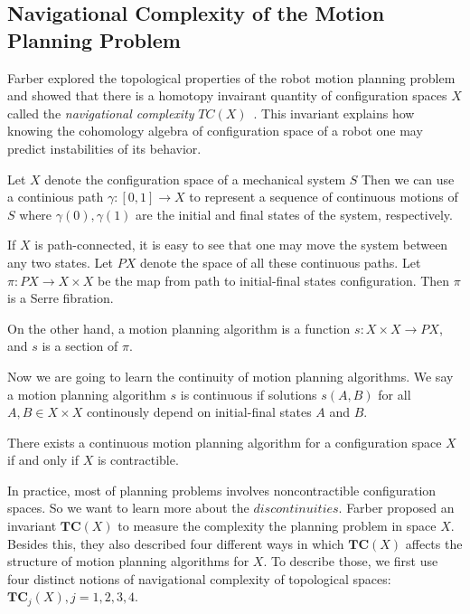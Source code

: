 \subsection{Navigational Complexity of the Motion Planning Problem}
Farber explored the topological properties of the robot motion planning problem and showed that there is a homotopy invairant quantity of configuration spaces \(X\) called the \textit{navigational complexity} \(TC(X)\)~\cite{farber2003topological,farber2004instabilities}.
This invariant  explains how knowing the cohomology algebra of
configuration space of a robot one may predict instabilities of its behavior.

Let \(X\) denote the configuration space of a mechanical system \(S\)
Then we can use a continious path \(\gamma:[0,1]\to X\) to represent a sequence of continuous motions of \(S\) where \(\gamma(0),\gamma(1)\) are the initial and final states of the system, respectively.

If \(X\) is path-connected, it is easy to see that one may move the system between any two states.
Let \(PX\) denote the space of all these continuous paths.
Let \(\pi:PX\to X\times X\) be the map from path to initial-final states configuration.
Then \(\pi\) is a Serre fibration.

On the other hand, a motion planning algorithm is a function \(s:X\times X\to PX\), and \(s\) is a section of \(\pi\).

Now we are going to learn the continuity of motion planning algorithms.
We say a motion planning algorithm \(s\) is continuous if solutions \(s(A,B)\) for all \(A,B\in X\times X\) continously depend on initial-final states \(A\) and \(B\).

\begin{lemma}
There exists a continuous motion planning algorithm for a configuration space \(X\) if and only if \(X\) is contractible.
\end{lemma}
In practice, most of planning problems involves noncontractible configuration spaces.
So we want to learn more about the \(discontinuities\).
Farber proposed an invariant \(\mathbf{TC}(X)\) to measure the complexity the planning problem in space \(X\).
Besides this, they also described four different ways in which \(\mathbf{TC}(X)\) affects the structure of motion planning algorithms for \(X\).
To describe those, we first use four distinct notions of navigational complexity of topological spaces: \(\mathbf{TC}_j(X), j=1,2,3,4\).

